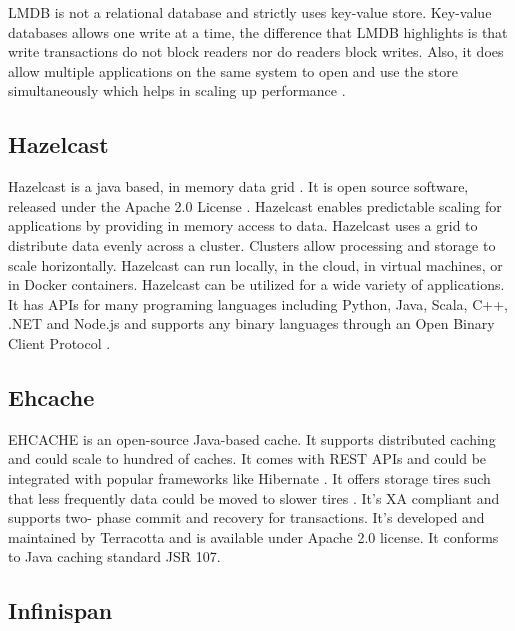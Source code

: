      LMDB is not a relational database \cite{www-relationaldb} and
     strictly uses key-value store. Key-value databases allows one
     write at a time, the difference that LMDB highlights is that
     write transactions do not block readers nor do readers block
     writes. Also, it does allow multiple applications on the same
     system to open and use the store simultaneously which helps in
     scaling up performance \cite{www-lmdb}.

\subsection{ Hazelcast}

     Hazelcast is a java based, in memory data grid
     \cite{www-wikihazel}.  It is open source software, released
     under the Apache 2.0 License \cite{www-githubhazel}. Hazelcast
     enables predictable scaling for applications by providing in
     memory access to data.  Hazelcast uses a grid to distribute data
     evenly across a cluster. Clusters allow processing and storage to
     scale horizontally. Hazelcast can run locally, in the cloud, in
     virtual machines, or in Docker containers. Hazelcast can be
     utilized for a wide variety of applications. It has APIs for many
     programing languages including Python, Java, Scala, C++, .NET and
     Node.js and supports any binary languages through an Open Binary
     Client Protocol \cite{www-wikihazel}.

\subsection{ Ehcache}

     EHCACHE is an open-source Java-based cache. It supports
     distributed caching and could scale to hundred of caches. It
     comes with REST APIs and could be integrated with popular
     frameworks like Hibernate \cite{www-ehcache-features}. It offers
     storage tires such that less frequently data could be moved to
     slower tires \cite{www-ehcache-documentation}. It's XA compliant
     and supports two- phase commit and recovery for
     transactions. It's developed and maintained by Terracotta and is
     available under Apache 2.0 license.  It conforms to Java caching
     standard JSR 107.

\subsection{ Infinispan}

